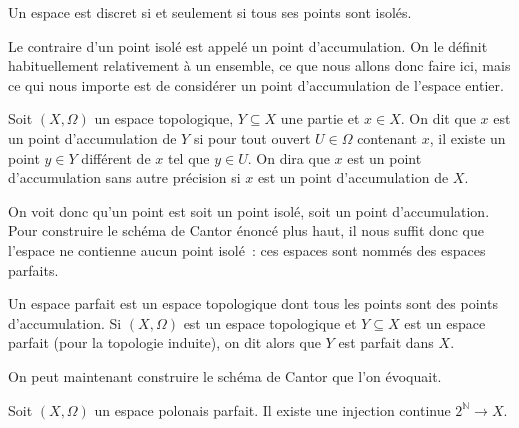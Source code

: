 \begin{remark}
  Un espace est discret si et seulement si tous ses points sont isolés.
\end{remark}

Le contraire d'un point isolé est appelé un point d'accumulation. On le définit
habituellement relativement à un ensemble, ce que nous allons donc faire ici,
mais ce qui nous importe est de considérer un point d'accumulation de l'espace
entier.

\begin{definition}
  Soit $(X,\Omega)$ un espace topologique, $Y\subseteq X$ une partie et
  $x\in X$. On dit que $x$ est un point d'accumulation de $Y$ si pour tout
  ouvert $U\in\Omega$ contenant $x$, il existe un point $y\in Y$ différent de
  $x$ tel que $y\in U$. On dira que $x$ est un point d'accumulation sans
  autre précision si $x$ est un point d'accumulation de $X$.
\end{definition}

On voit donc qu'un point est soit un point isolé, soit un point d'accumulation.
Pour construire le schéma de Cantor énoncé plus haut, il nous suffit donc
que l'espace ne contienne aucun point isolé~: ces espaces sont nommés des
espaces parfaits.

\begin{definition}
  Un espace parfait est un espace topologique dont tous les points sont des
  points d'accumulation. Si $(X,\Omega)$ est un espace topologique et
  $Y\subseteq X$ est un espace parfait (pour la topologie induite), on dit alors
  que $Y$ est parfait dans $X$.
\end{definition}

On peut maintenant construire le schéma de Cantor que l'on évoquait.

\begin{proposition}
  Soit $(X,\Omega)$ un espace polonais parfait. Il existe une injection continue
  $2^{\mathbb N} \to X$.
\end{proposition}

